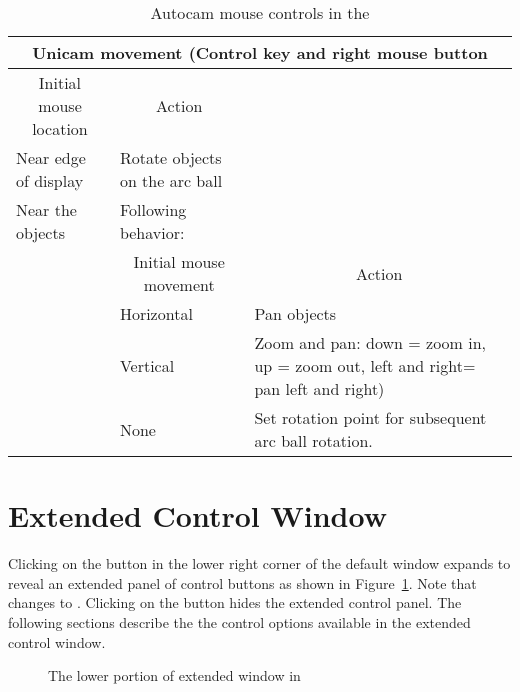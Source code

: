 \begin{table}
\begin{center}
\begin{tabular}{|l|l|p{3in}|} \hline
    \multicolumn{3}{|c|}{\large Unicam movement (Control key and right mouse
    button} \\ \hline \hline
    \multicolumn{1}{|c|}{Initial mouse location} & 
    \multicolumn{1}{|c|}{Action} & \\ 
    \hline
    Near edge of display & Rotate objects on the arc ball & \\
    Near the objects & Following behavior: & \\
    \hline
    & \multicolumn{1}{|c|}{Initial mouse movement} & 
    \multicolumn{1}{|c|}{Action}\\ \hline
    & Horizontal & Pan objects \\ 
    & Vertical & Zoom and pan: down = zoom in, up = zoom
    out, left and right= pan left and right) \\
    & None & Set rotation point for subsequent arc ball rotation.\\
    \hline
\end{tabular}
\caption{\label{tab:view-unicam} Autocam mouse controls in the \viewer{}}
\end{center}
\end{table}



\section{Extended Control Window}
\label{sec:view-control} 

Clicking on the \button{[+]} button in the lower right corner of the
default \viewer{} window expands to reveal an extended panel of
control buttons as shown in Figure~\ref{fig:extviewwindow}.  Note that
\button{[+]} changes to \button{[-]}.  Clicking on the \button{[-]}
button hides the extended control panel.  The following sections
describe the the control options available in the extended control
window.

\begin{figure}[htb]
  \begin{makeimage}
  \end{makeimage}
  \extendedwindow
  \caption{\label{fig:extviewwindow} The lower portion of extended
    \viewer{} window in \SR{}} 
\end{figure}


